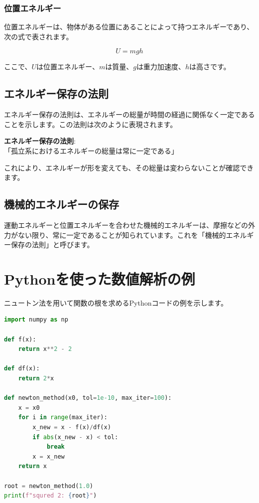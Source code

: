 \documentclass[
  11pt,
  pandoc,
  a4paper,
  pdflatex,
  japaram={jis2004}]{bxjsarticle}
\begin{document}
\subsubsection{位置エネルギー}\label{ux4f4dux7f6eux30a8ux30cdux30ebux30aeux30fc}

位置エネルギーは、物体がある位置にあることによって持つエネルギーであり、次の式で表されます。

\[
U = mgh
\]

ここで、\(U\)は位置エネルギー、\(m\)は質量、\(g\)は重力加速度、\(h\)は高さです。

\subsection{エネルギー保存の法則}\label{ux30a8ux30cdux30ebux30aeux30fcux4fddux5b58ux306eux6cd5ux5247-1}

エネルギー保存の法則は、エネルギーの総量が時間の経過に関係なく一定であることを示します。この法則は次のように表現されます。

\begin{tcolorbox}

\textbf{エネルギー保存の法則}:\\
「孤立系におけるエネルギーの総量は常に一定である」

\end{tcolorbox}

これにより、エネルギーが形を変えても、その総量は変わらないことが確認できます。

\subsection{機械的エネルギーの保存}\label{ux6a5fux68b0ux7684ux30a8ux30cdux30ebux30aeux30fcux306eux4fddux5b58}

運動エネルギーと位置エネルギーを合わせた機械的エネルギーは、摩擦などの外力がない限り、常に一定であることが知られています。これを「機械的エネルギー保存の法則」と呼びます。

\section{Pythonを使った数値解析の例}\label{pythonux3092ux4f7fux3063ux305fux6570ux5024ux89e3ux6790ux306eux4f8b}

ニュートン法を用いて関数の根を求めるPythonコードの例を示します。

\begin{lstlisting}[language=Python]
import numpy as np

def f(x):
    return x**2 - 2

def df(x):
    return 2*x

def newton_method(x0, tol=1e-10, max_iter=100):
    x = x0
    for i in range(max_iter):
        x_new = x - f(x)/df(x)
        if abs(x_new - x) < tol:
            break
        x = x_new
    return x

root = newton_method(1.0)
print(f"squred 2: {root}")
\end{lstlisting}
\end{document}
